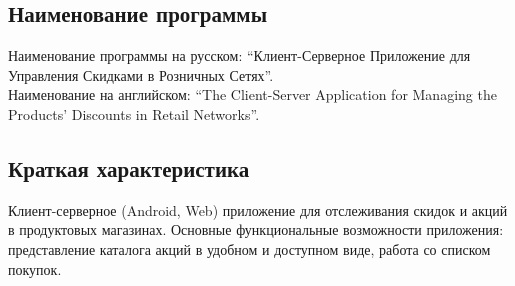 \subsection{Наименование программы}
Наименование программы на русском: 
``Клиент-Серверное Приложение для Управления Скидками в Розничных Сетях''. \\
Наименование на английском: 
``The Client-Server Application for Managing the Products' Discounts in Retail Networks''. \\


\subsection{Краткая характеристика}
Клиент-серверное (Android, Web) приложение для отслеживания скидок и акций в продуктовых магазинах.
Основные функциональные возможности приложения: представление каталога акций в удобном и доступном
виде, работа со списком покупок.
